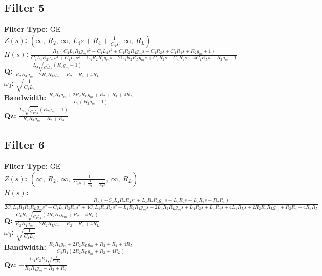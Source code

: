 \documentclass{article}
\begin{document}
\subsection*{Filter 5}
\textbf{Filter Type:} GE \\ 
\textbf{$Z(s)$:} $\left( \infty, \  R_{2}, \  \infty, \  L_{4} s + R_{4} + \frac{1}{C_{4} s}, \  \infty, \  R_{L}\right)$ \\ 
\textbf{$H(s)$:} $\frac{R_{L} \left(C_{4} L_{4} R_{2} g_{m} s^{2} + C_{4} L_{4} s^{2} + C_{4} R_{2} R_{4} g_{m} s - C_{4} R_{2} s + C_{4} R_{4} s + R_{2} g_{m} + 1\right)}{C_{4} L_{4} R_{2} g_{m} s^{2} + C_{4} L_{4} s^{2} + C_{4} R_{2} R_{4} g_{m} s + 2 C_{4} R_{2} R_{L} g_{m} s + C_{4} R_{2} s + C_{4} R_{4} s + 4 C_{4} R_{L} s + R_{2} g_{m} + 1}$ \\ 
\textbf{Q:} $\frac{L_{4} \sqrt{\frac{1}{C_{4} L_{4}}} \left(R_{2} g_{m} + 1\right)}{R_{2} R_{4} g_{m} + 2 R_{2} R_{L} g_{m} + R_{2} + R_{4} + 4 R_{L}}$ \\ 
\textbf{$\omega_0$:} $\sqrt{\frac{1}{C_{4} L_{4}}}$ \\ 
\textbf{Bandwidth:} $\frac{R_{2} R_{4} g_{m} + 2 R_{2} R_{L} g_{m} + R_{2} + R_{4} + 4 R_{L}}{L_{4} \left(R_{2} g_{m} + 1\right)}$ \\ 
\textbf{Qz:} $\frac{L_{4} \sqrt{\frac{1}{C_{4} L_{4}}} \left(R_{2} g_{m} + 1\right)}{R_{2} R_{4} g_{m} - R_{2} + R_{4}}$ \\ 
\subsection*{Filter 6}
\textbf{Filter Type:} GE \\ 
\textbf{$Z(s)$:} $\left( \infty, \  R_{2}, \  \infty, \  \frac{1}{C_{4} s + \frac{1}{R_{4}} + \frac{1}{L_{4} s}}, \  \infty, \  R_{L}\right)$ \\ 
\textbf{$H(s)$:} $\frac{R_{L} \left(- C_{4} L_{4} R_{2} R_{4} s^{2} + L_{4} R_{2} R_{4} g_{m} s - L_{4} R_{2} s + L_{4} R_{4} s - R_{2} R_{4}\right)}{2 C_{4} L_{4} R_{2} R_{4} R_{L} g_{m} s^{2} + C_{4} L_{4} R_{2} R_{4} s^{2} + 4 C_{4} L_{4} R_{4} R_{L} s^{2} + L_{4} R_{2} R_{4} g_{m} s + 2 L_{4} R_{2} R_{L} g_{m} s + L_{4} R_{2} s + L_{4} R_{4} s + 4 L_{4} R_{L} s + 2 R_{2} R_{4} R_{L} g_{m} + R_{2} R_{4} + 4 R_{4} R_{L}}$ \\ 
\textbf{Q:} $\frac{C_{4} R_{4} \sqrt{\frac{1}{C_{4} L_{4}}} \left(2 R_{2} R_{L} g_{m} + R_{2} + 4 R_{L}\right)}{R_{2} R_{4} g_{m} + 2 R_{2} R_{L} g_{m} + R_{2} + R_{4} + 4 R_{L}}$ \\ 
\textbf{$\omega_0$:} $\sqrt{\frac{1}{C_{4} L_{4}}}$ \\ 
\textbf{Bandwidth:} $\frac{R_{2} R_{4} g_{m} + 2 R_{2} R_{L} g_{m} + R_{2} + R_{4} + 4 R_{L}}{C_{4} R_{4} \left(2 R_{2} R_{L} g_{m} + R_{2} + 4 R_{L}\right)}$ \\ 
\textbf{Qz:} $- \frac{C_{4} R_{2} R_{4} \sqrt{\frac{1}{C_{4} L_{4}}}}{R_{2} R_{4} g_{m} - R_{2} + R_{4}}$ \\ 
\end{document}
